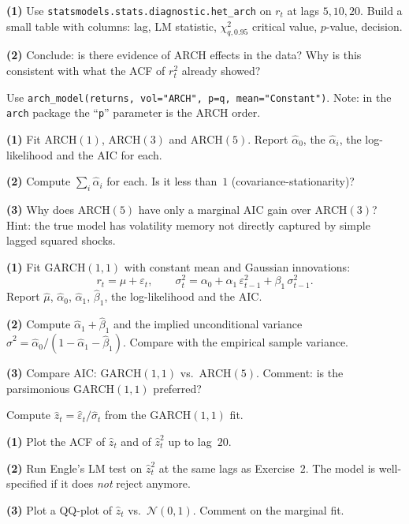 \documentclass[a4paper,11pt]{article}
\begin{document}
\begin{exercise}
\textbf{(1)} Use
\texttt{statsmodels.stats.diagnostic.het\_arch} on $r_t$ at lags
$5, 10, 20$. Build a small table with columns: lag, LM statistic,
$\chi^2_{q, 0.95}$ critical value, $p$-value, decision.

\textbf{(2)} Conclude: is there evidence of ARCH effects in the
data? Why is this consistent with what the ACF of $r_t^2$ already
showed?
\end{exercise}

\begin{exercise}
Use \texttt{arch\_model(returns, vol="ARCH", p=q,
mean="Constant")}. Note: in the \texttt{arch} package the
``\texttt{p}'' parameter is the ARCH order.

\textbf{(1)} Fit ARCH$(1)$, ARCH$(3)$ and ARCH$(5)$. Report
$\widehat\alpha_0$, the $\widehat\alpha_i$, the log-likelihood and
the AIC for each.

\textbf{(2)} Compute $\sum_i \widehat\alpha_i$ for each. Is it less
than~$1$ (covariance-stationarity)?

\textbf{(3)} Why does ARCH$(5)$ have only a marginal AIC gain over
ARCH$(3)$? Hint: the true model has volatility memory not directly
captured by simple lagged squared shocks.
\end{exercise}

\begin{exercise}
\textbf{(1)} Fit GARCH$(1, 1)$ with constant mean and Gaussian
innovations:
\[
  r_t = \mu + \varepsilon_t,
  \qquad
  \sigma_t^2 = \alpha_0
              + \alpha_1\, \varepsilon_{t-1}^2
              + \beta_1\, \sigma_{t-1}^2.
\]
Report $\widehat\mu$, $\widehat\alpha_0$, $\widehat\alpha_1$,
$\widehat\beta_1$, the log-likelihood and the AIC.

\textbf{(2)} Compute $\widehat\alpha_1 + \widehat\beta_1$ and the
implied unconditional variance
$\widehat\sigma^2 = \widehat\alpha_0 / (1 - \widehat\alpha_1 -
\widehat\beta_1)$. Compare with the empirical sample variance.

\textbf{(3)} Compare AIC: GARCH$(1, 1)$ vs.\ ARCH$(5)$. Comment:
is the parsimonious GARCH$(1, 1)$ preferred?
\end{exercise}

\begin{exercise}
Compute $\widehat z_t = \widehat\varepsilon_t / \widehat\sigma_t$
from the GARCH$(1, 1)$ fit.

\textbf{(1)} Plot the ACF of $\widehat z_t$ and of
$\widehat z_t^2$ up to lag~$20$.

\textbf{(2)} Run Engle's LM test on $\widehat z_t^2$ at the same
lags as Exercise~$2$. The model is well-specified if it does
\emph{not} reject anymore.

\textbf{(3)} Plot a QQ-plot of $\widehat z_t$ vs.\ $\mathcal N(0, 1)$.
Comment on the marginal fit.
\end{exercise}
\end{document}
